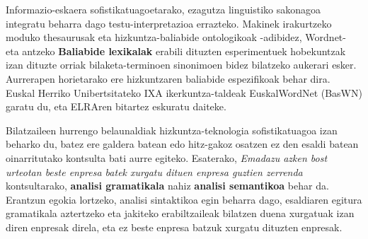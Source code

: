 \begin{multicols}{2}
Informazio-eskaera sofistikatuagoetarako, ezagutza linguistiko sakonagoa integratu beharra dago testu-interpretazioa errazteko. Makinek irakurtzeko moduko thesaurusak eta hizkuntza-baliabide ontologikoak -adibidez, Wordnet- eta antzeko \textbf{Baliabide lexikalak} erabili dituzten esperimentuek hobekuntzak izan dituzte orriak bilaketa-terminoen sinonimoen bidez bilatzeko aukerari esker. Aurrerapen horietarako ere hizkuntzaren baliabide espezifikoak behar dira. Euskal Herriko Unibertsitateko IXA ikerkuntza-taldeak EuskalWordNet (BasWN) garatu du, eta ELRAren bitartez eskuratu daiteke.


Bilatzaileen hurrengo belaunaldiak hizkuntza-teknologia sofistikatuagoa izan beharko du, batez ere galdera batean edo hitz-gakoz osatzen ez den esaldi batean oinarritutako kontsulta bati aurre egiteko. Esaterako, \textit{Emadazu azken bost urteotan beste enpresa batek xurgatu dituen enpresa guztien zerrenda} kontsultarako, 
\textbf{analisi gramatikala}
nahiz \textbf{analisi semantikoa} behar da. Erantzun egokia lortzeko, analisi sintaktikoa egin beharra dago, esaldiaren egitura gramatikala aztertzeko eta jakiteko erabiltzaileak bilatzen duena xurgatuak izan diren enpresak direla, eta ez beste enpresa batzuk xurgatu dituzten enpresak.


\end{multicols}

